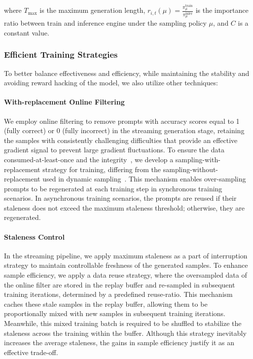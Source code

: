 where $T_{\text{max}}$ is the maximum generation length, $r_{i,t}(\mu)=\frac{\pi_{\mu}^\text{train}}{\pi_{\mu}^\text{infer}}$ is the importance ratio between train and inference engine under the sampling policy $\mu$, and $C$ is a constant value. 

\subsubsection{Efficient Training Strategies}

To better balance effectiveness and efficiency, while maintaining the stability and avoiding reward hacking of the model, we also utilize other techniques:
\noindent\paragraph{With-replacement Online Filtering} We employ online filtering to remove prompts with accuracy scores equal to 1 (fully correct) or 0 (fully incorrect) in the streaming generation stage, retaining the samples with consistently challenging difficulties that provide an effective gradient signal to prevent large gradient fluctuations. To ensure the data consumed-at-least-once and the integrity~\citep{xiao2024antdt}, we develop a sampling-with-replacement strategy for training, differing from the sampling-without-replacement used in dynamic sampling~\citep{dapo}. 
This mechanism enables over-sampling prompts to be regenerated at each training step in synchronous training scenarios. In asynchronous training scenarios, the prompts are reused if their staleness does not exceed the maximum staleness threshold; otherwise, they are regenerated.
\noindent\paragraph{Staleness Control} In the streaming pipeline, we apply maximum staleness as a part of interruption strategy to maintain controllable freshness of the generated samples. To enhance sample efficiency, we apply a data reuse strategy, where the oversampled data of the online filter are stored in the replay buffer and re-sampled in subsequent training iterations, determined by a predefined reuse-ratio. This mechanism caches these stale samples in the replay buffer, allowing them to be proportionally mixed with new samples in subsequent training iterations. Meanwhile, this mixed training batch is required to be shuffled to stabilize the staleness across the training within the buffer. Although this strategy inevitably increases the average staleness, the gains in sample efficiency justify it as an effective trade-off. 
